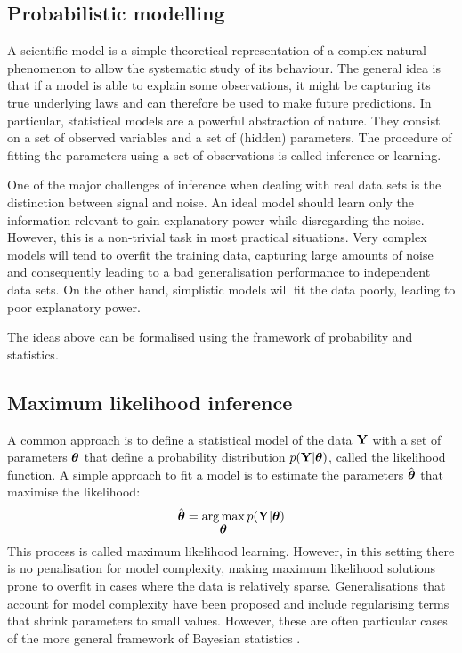 \subsection{Probabilistic modelling} \label{section:probabilistic_modelling}

A scientific model is a simple theoretical representation of a complex natural phenomenon to allow the systematic study of its behaviour. The general idea is that if a model is able to explain some observations, it might be capturing its true underlying laws and can therefore be used to make future predictions.
In particular, statistical models are a powerful abstraction of nature. They consist on a set of observed variables and a set of (hidden) parameters. The procedure of fitting the parameters using a set of observations is called inference or learning.

One of the major challenges of inference when dealing with real data sets is the distinction between signal and noise. An ideal model should learn only the information relevant to gain explanatory power while disregarding the noise. However, this is a non-trivial task in most practical situations. Very complex models will tend to overfit the training data, capturing large amounts of noise and consequently leading to a bad generalisation performance to independent data sets. On the other hand, simplistic models will fit the data poorly, leading to poor explanatory power.

The ideas above can be formalised using the framework of probability and statistics.

\subsection{Maximum likelihood inference} \label{section:maximum_likelihood}

A common approach is to define a statistical model of the data ${\bf Y}$ with a set of parameters $\mbox{\boldmath $\theta$}$ that define a probability distribution $p({\bf Y}|\mbox{\boldmath $\theta$})$, called the likelihood function. A simple approach to fit a model is to estimate the parameters $\hat{\mbox{\boldmath $\theta$}}$ that maximise the likelihood:
\[
	\hat{\mbox{\boldmath $\theta$}} = \operatorname*{arg\,max}_{\mbox{\boldmath $\theta$}} p({\bf Y}|\mbox{\boldmath $\theta$})
\]
This process is called maximum likelihood learning\cite{Stigler2008,Bishop2006,Murphy}. However, in this setting there is no penalisation for model complexity, making maximum likelihood solutions prone to overfit in cases where the data is relatively sparse. Generalisations that account for model complexity have been proposed and include regularising terms that shrink parameters to small values. However, these are often particular cases of the more general framework of Bayesian statistics \cite{Hastie,Bishop2006,Murphy}.

